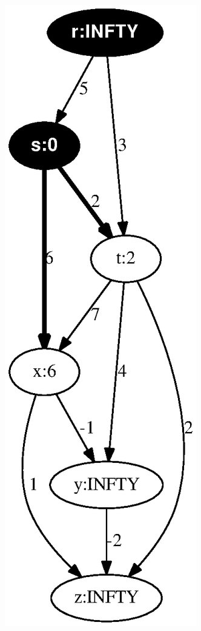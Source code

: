 \documentclass{article}
\begin{document}
\includegraphics[height=.3\textheight]{dag_shortest_path_02.eps}
\vspace{1em}
\end{document}
